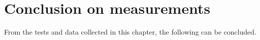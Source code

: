 \section{Conclusion on measurements}\label{sec:mescon}

From the tests and data collected in this chapter, the following can be concluded.